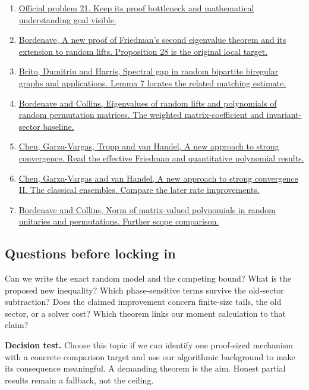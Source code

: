 \documentclass[11pt,letterpaper]{article}
\newcommand{\Sub}[1]{\subsection*{#1}}
\newcommand{\source}[2]{\item \href{#1}{#2}}
\begin{document}
\begin{enumerate}
\source{https://competition.sair.foundation/competitions/mathathon/problems/21}{Official problem 21. Keep its proof bottleneck and mathematical understanding goal visible.}
\source{https://arxiv.org/abs/1502.04482}{Bordenave, A new proof of Friedman's second eigenvalue theorem and its extension to random lifts. Proposition 28 is the original local target.}
\source{https://arxiv.org/abs/1804.07808}{Brito, Dumitriu and Harris, Spectral gap in random bipartite biregular graphs and applications. Lemma 7 locates the related matching estimate.}
\source{https://arxiv.org/abs/1801.00876}{Bordenave and Collins, Eigenvalues of random lifts and polynomials of random permutation matrices. The weighted matrix-coefficient and invariant-sector baseline.}
\source{https://arxiv.org/abs/2405.16026}{Chen, Garza-Vargas, Tropp and van Handel, A new approach to strong convergence. Read the effective Friedman and quantitative polynomial results.}
\source{https://arxiv.org/abs/2412.00593}{Chen, Garza-Vargas and van Handel, A new approach to strong convergence II. The classical ensembles. Compare the later rate improvements.}
\source{https://arxiv.org/abs/2304.05714}{Bordenave and Collins, Norm of matrix-valued polynomials in random unitaries and permutations. Further scope comparison.}
\end{enumerate}
\Sub{Questions before locking in}
Can we write the exact random model and the competing bound? What is the proposed new inequality? Which phase-sensitive terms survive the old-sector subtraction? Does the claimed improvement concern finite-size tails, the old sector, or a solver cost? Which theorem links our moment calculation to that claim?

\textbf{Decision test.} Choose this topic if we can identify one proof-sized mechanism with a concrete comparison target and use our algorithmic background to make its consequence meaningful. A demanding theorem is the aim. Honest partial results remain a fallback, not the ceiling.
\end{document}
